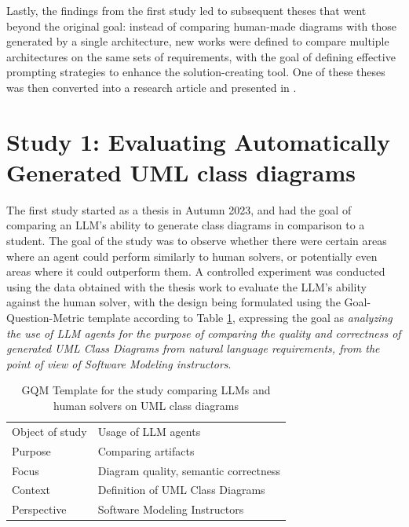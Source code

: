 Lastly, the findings from the first study led to subsequent theses that went beyond the original goal: instead of comparing human-made diagrams with those generated by a single architecture, new works were defined to compare multiple architectures on the same sets of requirements, with the goal of defining effective prompting strategies to enhance the solution-creating tool. One of these theses was then converted into a research article and presented in \cite{garaccione2025models}.

\section{Study 1: Evaluating Automatically Generated UML class diagrams}

The first study started as a thesis in Autumn 2023, and had the goal of comparing an LLM's ability to generate class diagrams in comparison to a student. The goal of the study was to observe whether there were certain areas where an agent could perform similarly to human solvers, or potentially even areas where it could outperform them. A controlled experiment was conducted using the data obtained with the thesis work to evaluate the LLM's ability against the human solver, with the design being formulated using the Goal-Question-Metric template according to Table \ref{tab:llm4mod1_gqm}, expressing the goal as \textit{analyzing the use of LLM agents for the purpose of comparing the quality and correctness of generated UML Class Diagrams from natural language requirements, from the point of view of Software Modeling instructors}.

\begin{table}[ht]
\centering
\small
\caption{GQM Template for the study comparing LLMs and human solvers on UML class diagrams}
\label{tab:llm4mod1_gqm}
    \begin{tabular}{@{}p{} p{}@{}}
    \toprule
    Object of study & Usage of LLM agents\\
    Purpose & Comparing artifacts\\
    Focus & Diagram quality, semantic correctness\\
    Context & Definition of UML Class Diagrams\\
    Perspective & Software Modeling Instructors\\
    \bottomrule
    \end{tabular}
\end{table}

